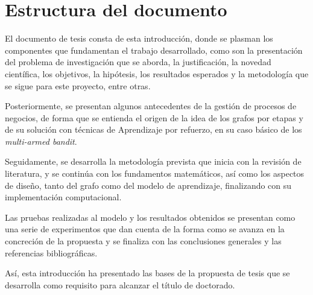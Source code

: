


\section{Estructura del documento}

El documento de tesis consta de esta introducción, donde se plasman los componentes que fundamentan el trabajo desarrollado, como son la presentación del problema de investigación que se aborda, la justificación, la novedad científica, los objetivos, la hipótesis, los resultados esperados y la metodología que se sigue para este proyecto, entre otras. 

Posteriormente, se presentan algunos antecedentes de la gestión de procesos de negocios, de forma que se entienda el origen de la idea de los grafos por etapas y de su solución con técnicas de Aprendizaje por refuerzo, en su caso básico de los \textit{multi-armed bandit}.

Seguidamente, se desarrolla la metodología prevista que inicia con la revisión de literatura, y se continúa con los fundamentos matemáticos, así como los aspectos de diseño, tanto del grafo como del modelo de aprendizaje, finalizando con su implementación computacional.

Las pruebas realizadas al modelo y los resultados obtenidos se presentan como una serie de experimentos que dan cuenta de la forma como se avanza en la concreción de la propuesta y se finaliza con las conclusiones generales y las referencias bibliográficas.

Así, esta introducción ha presentado las bases de la propuesta de tesis que se desarrolla como requisito para alcanzar el título de doctorado.


